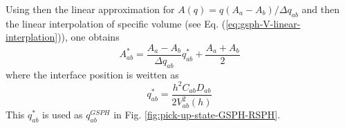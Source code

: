 Using then the linear approximation for $A(q) = q(A_a - A_b)/ \Delta q_{ab}$ and then the linear interpolation of specific volume (see Eq. (\ref{eq:gsph-V-linear-interplation})), one obtains 
\begin{equation}
A_{ab}^{\ast} = \frac{A_a - A_b}{\Delta q_{ab}} q_{ab}^{\ast} + \frac{A_a + A_b}{2}
\label{eq:GSPH-f-interpolation-evaluation}
\end{equation}
where the interface position is weitten as
\begin{equation}
q_{ab}^{\ast} = \frac{h^2 C_{ab} D_{ab}}{2V_{ab}^2(h)}
\label{eq:GSPH-f-interpolation-evaluation}
\end{equation}
This $q_{ab}^{\ast}$ is used as $q_{ab}^{GSPH}$ in Fig. \ref{fig:pick-up-state-GSPH-RSPH}.